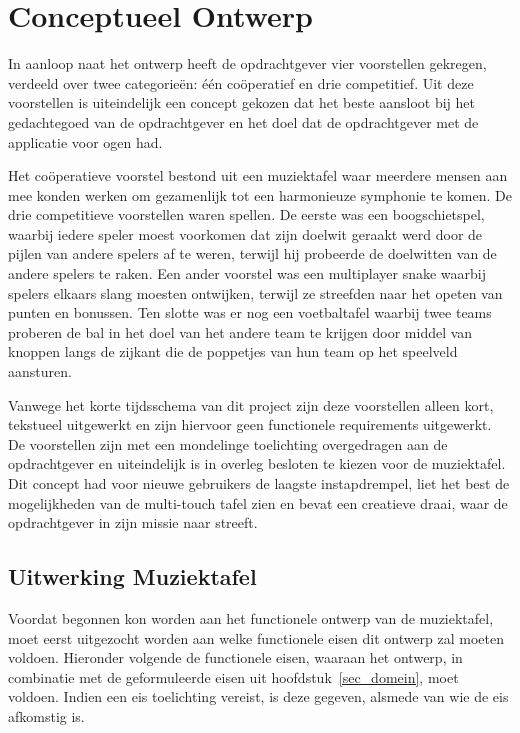 \documentclass{acm}
\begin{document}
\section{Conceptueel Ontwerp}
\label{sec_concept}
In aanloop naat het ontwerp heeft de opdrachtgever vier voorstellen gekregen, verdeeld over twee categorie\"en: \'e\'en co\"operatief en drie competitief. Uit deze voorstellen is uiteindelijk een concept gekozen dat het beste aansloot bij het gedachtegoed van de opdrachtgever en het doel dat de opdrachtgever met de applicatie voor ogen had.

Het co\"operatieve voorstel bestond uit een muziektafel waar meerdere mensen aan mee konden werken om gezamenlijk tot een harmonieuze symphonie te komen. De drie competitieve voorstellen waren spellen. De eerste was een boogschietspel, waarbij iedere speler moest voorkomen dat zijn doelwit geraakt werd door de pijlen van andere spelers af te weren, terwijl hij probeerde de doelwitten van de andere spelers te raken. Een ander voorstel was een multiplayer snake waarbij spelers elkaars slang moesten ontwijken, terwijl ze streefden naar het opeten van punten en bonussen. Ten slotte was er nog een voetbaltafel waarbij twee teams proberen de bal in het doel van het andere team te krijgen door middel van knoppen langs de zijkant die de poppetjes van hun team op het speelveld aansturen.

Vanwege het korte tijdsschema van dit project zijn deze voorstellen alleen kort, tekstueel uitgewerkt en zijn hiervoor geen functionele requirements uitgewerkt. De voorstellen zijn met een mondelinge toelichting overgedragen aan de opdrachtgever en uiteindelijk is in overleg besloten te kiezen voor de muziektafel. Dit concept had voor nieuwe gebruikers de laagste instapdrempel, liet het best de mogelijkheden van de multi-touch tafel zien en bevat een creatieve draai, waar de opdrachtgever in zijn missie naar streeft.

\subsection{Uitwerking Muziektafel}
Voordat begonnen kon worden aan het functionele ontwerp van de muziektafel, moet eerst uitgezocht worden aan welke functionele eisen dit ontwerp zal moeten voldoen. Hieronder volgende de functionele eisen, waaraan het ontwerp, in combinatie met de geformuleerde eisen uit hoofdstuk~\ref{sec_domein}, moet voldoen. Indien een eis toelichting vereist, is deze gegeven, alsmede van wie de eis afkomstig is.
\end{document}
